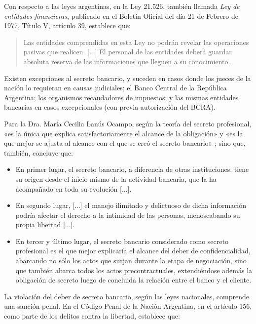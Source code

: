 \documentclass[12pt,a4paper,twoside]{book}
\begin{document}
Con respecto a las leyes argentinas, en la Ley 21.526, también llamada \textit{Ley de entidades financieras}, publicado en el Boletín Oficial del día 21 de Febrero de 1977, Título V, artículo 39, establece que:

\begin{quote}
Las entidades comprendidas en esta Ley no podrán revelar las operaciones pasivas que realicen. [...] El personal de las entidades deberá guardar absoluta reserva de las informaciones que lleguen a su conocimiento. \cite[Art. 39]{ley-secreto-bancario}
\end{quote}

Existen excepciones al secreto bancario, y suceden en casos donde los jueces de la nación lo requieran en causas judiciales; el Banco Central de la República Argentina; los organismos recaudadores de impuestos; y las mismas entidades bancarias en casos excepcionales (con previa autorización del BCRA).

Para la Dra. María Cecilia Lanús Ocampo, según la teoría del secreto profesional, «es la única que explica satisfactoriamente el alcance de la obligación» y «es la que mejor se ajusta al alcance con el que se creó el secreto bancario» \cite[pág. 5]{secreto-bancario}; sino que, también, concluye que:

\begin{itemize}
\item En primer lugar, el secreto bancario, a diferencia de otras instituciones, tiene su origen desde el inicio mismo de la actividad bancaria, que la ha acompañado en toda su evolución [...].
\item En segundo lugar, [...] el manejo ilimitado y delictuoso de dicha información podría afectar el derecho a la intimidad de las personas, menoscabando su propia libertad [...].
\item En tercer y último lugar, el secreto bancario considerado como secreto profesional es el que mejor explicaría el alcance del deber de confidencialidad, abarcando no sólo los actos que surjan durante la etapa de negociación, sino que también abarca todos los actos precontractuales, extendiéndose además la obligación de secreto luego de concluida la relación entre el banco y el cliente.
\end{itemize}

La violación del deber de secreto bancario, según las leyes nacionales, comprende una sanción penal. En el Código Penal de la Nación Argentina, en el artículo 156, como parte de los delitos contra la libertad, establece que:
\end{document}
